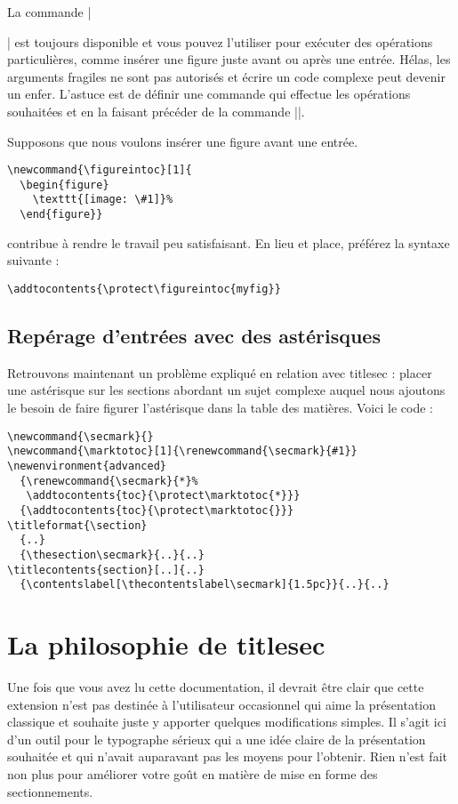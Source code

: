 \documentclass[a4paper]{ltxguide}
\begin{document}
La commande |\addtocontents| est toujours disponible et vous pouvez l'utiliser
pour exécuter des opérations particulières, comme insérer une figure juste
avant ou après une entrée. Hélas, les arguments fragiles ne sont pas autorisés
et écrire un code complexe peut devenir un enfer. L'astuce est de définir 
une commande qui effectue les opérations souhaitées et en la faisant précéder
de la commande |\protect|.

Supposons que nous voulons insérer une figure avant une entrée.
\begin{verbatim}
\newcommand{\figureintoc}[1]{
  \begin{figure}
    \texttt{[image: \#1]}%
  \end{figure}}
\end{verbatim}
contribue à rendre le travail peu satisfaisant. En lieu et place, préférez
la syntaxe suivante :
\begin{verbatim}
\addtocontents{\protect\figureintoc{myfig}}
\end{verbatim}


\subsection{Repérage d'entrées avec des astérisques}

Retrouvons maintenant un problème expliqué en relation avec \textsf{titlesec} : 
placer une astérisque sur les sections abordant un \og sujet complexe \fg{} auquel
nous ajoutons le besoin de faire figurer l'astérisque dans la table des matières. 
Voici le code :
\begin{verbatim}
\newcommand{\secmark}{}
\newcommand{\marktotoc}[1]{\renewcommand{\secmark}{#1}}
\newenvironment{advanced}
  {\renewcommand{\secmark}{*}%
   \addtocontents{toc}{\protect\marktotoc{*}}}
  {\addtocontents{toc}{\protect\marktotoc{}}}
\titleformat{\section}
  {..}
  {\thesection\secmark}{..}{..}
\titlecontents{section}[..]{..}
  {\contentslabel[\thecontentslabel\secmark]{1.5pc}}{..}{..}
\end{verbatim}

\section{La philosophie de \textsf{titlesec}}

Une fois que vous avez lu cette documentation, il devrait être clair que cette
extension n'est pas destinée à l'utilisateur occasionnel qui aime la présentation
classique et souhaite juste y apporter quelques modifications simples. Il s'agit ici
d'un outil pour le typographe sérieux qui a une idée claire de la présentation 
souhaitée et qui n'avait auparavant pas les moyens pour l'obtenir. Rien n'est fait non
plus pour améliorer votre goût en matière de mise en forme des sectionnements.
\end{document}
